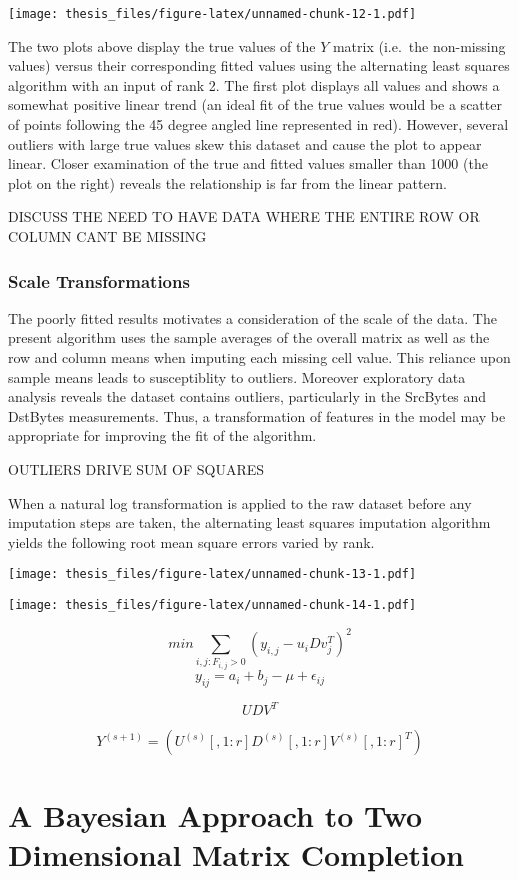 \documentclass[12pt,twoside]{dukestatscithesis}
\theoremstyle{definition}
\theoremstyle{definition}
\theoremstyle{definition}
\theoremstyle{remark}
\begin{document}
\texttt{[image: thesis\_files/figure-latex/unnamed-chunk-12-1.pdf]}

The two plots above display the true values of the \(Y\) matrix
(i.e.~the non-missing values) versus their corresponding fitted values
using the alternating least squares algorithm with an input of rank 2.
The first plot displays all values and shows a somewhat positive linear
trend (an ideal fit of the true values would be a scatter of points
following the 45 degree angled line represented in red). However,
several outliers with large true values skew this dataset and cause the
plot to appear linear. Closer examination of the true and fitted values
smaller than 1000 (the plot on the right) reveals the relationship is
far from the linear pattern.

DISCUSS THE NEED TO HAVE DATA WHERE THE ENTIRE ROW OR COLUMN CANT BE
MISSING

\subsection{Scale Transformations}\label{scale-transformations}

The poorly fitted results motivates a consideration of the scale of the
data. The present algorithm uses the sample averages of the overall
matrix as well as the row and column means when imputing each missing
cell value. This reliance upon sample means leads to susceptiblity to
outliers. Moreover exploratory data analysis reveals the dataset
contains outliers, particularly in the SrcBytes and DstBytes
measurements. Thus, a transformation of features in the model may be
appropriate for improving the fit of the algorithm.

OUTLIERS DRIVE SUM OF SQUARES

When a natural log transformation is applied to the raw dataset before
any imputation steps are taken, the alternating least squares imputation
algorithm yields the following root mean square errors varied by rank.

\texttt{[image: thesis\_files/figure-latex/unnamed-chunk-13-1.pdf]}

\texttt{[image: thesis\_files/figure-latex/unnamed-chunk-14-1.pdf]}

\[min \sum_{i,j:F_{i,j} > 0} (y_{i,j} - u_iDv^T_j)^2\]
\[y_{ij} =  a_i + b_j - \mu + \epsilon_{ij}\]

\[UDV^T\]

\[Y^{(s+1)} = (U^{(s)}[,1 : r]D^{(s)}[,1 : r]V^{(s)}[,1 : r]^T)\]

\chapter{A Bayesian Approach to Two Dimensional Matrix
Completion}\label{a-bayesian-approach-to-two-dimensional-matrix-completion}
\end{document}
